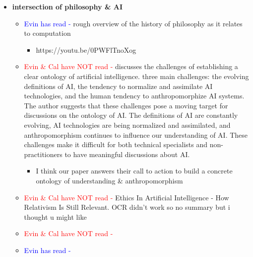 \documentclass{article}
\begin{document}
\begin{itemize}
    \item \textbf{intersection of philosophy \& AI}
    \begin{itemize}
        \item \textcolor{blue}{Evin has read -} \cite{dodig2023computational} rough overview of the history of philosophy as it relates to computation
        \begin{itemize}
            \item https://youtu.be/0PWFlTnoXog
        \end{itemize}
        \item \textcolor{red}{Evin \& Cal have NOT read - } \cite{hawley2019challenges} discusses the challenges of establishing a clear ontology of artificial intelligence. three main challenges: the evolving definitions of AI, the tendency to normalize and assimilate AI technologies, and the human tendency to anthropomorphize AI systems. The author suggests that these challenges pose a moving target for discussions on the ontology of AI. The definitions of AI are constantly evolving, AI technologies are being normalized and assimilated, and anthropomorphism continues to influence our understanding of AI. These challenges make it difficult for both technical specialists and non-practitioners to have meaningful discussions about AI. 
        \begin{itemize}
            \item I think our paper answers their call to action to build a concrete ontology of understanding \& anthropomorphism
        \end{itemize}
        \item \textcolor{red}{Evin \& Cal have NOT read - } \cite{piloidis2020ethics} Ethics In Artificial Intelligence - How Relativism Is Still Relevant. OCR didn't work so no summary but i thought u might like
        \item \textcolor{red}{Evin \& Cal have NOT read - }
        \item \textcolor{blue}{Evin has read -}
    \end{itemize}


\end{itemize}
\end{document}
